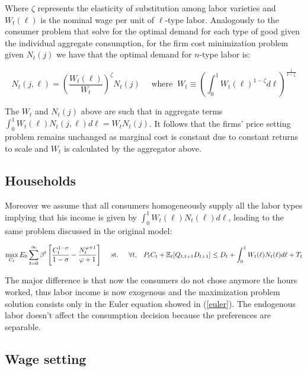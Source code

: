 \documentclass{article}
\newcommand{\Et}{\mathbb{E}_t}
\begin{document}
Where $\zeta$ represents the elasticity of substitution among labor varieties and $W_t(\ell)$ is the nominal wage per unit of $\ell$-type labor. Analogously to the consumer problem that solve for the optimal demand for each type of good given the individual aggregate consumption, for the firm cost minimization problem given $N_t(j)$ we have that the optimal demand for $n$-type labor is:

\begin{equation}
    N_t(j,\ell) = \left(\frac{W_t(\ell)}{W_t} \right)^\zeta N_t(j) \quad \textrm{ where } \ W_t \equiv \left(\int^1_0 W_t(\ell)^{1-\zeta} d\ell \right)^{\frac{1}{1-\zeta}}
\end{equation}

The $W_t$ and $N_t(j)$ above are such that in aggregate terms $\int^1_0 W_t(\ell) N_t(j,\ell) d\ell = W_t N_t(j)$. It follows that the firms' price setting problem remains unchanged as marginal cost is constant due to constant returns to scale and $W_t$ is calculated by the aggregator above.

\subsection{Households}
Moreover we assume that all consumers homogeneously supply all the labor types implying that his income is given by $\int^1_0 W_t(\ell) N_t(\ell) d\ell$, leading to the same problem discussed in the original model:

\begin{equation}
    \max_{C_t} E_0 \sum^\infty_{t=0} \beta^t \left[\frac{C_t^{1-\sigma}}{1-\sigma} - \frac{N_t^{\varphi+1}}{\varphi+1} \right] \hspace{1em}  \textrm{ st. } \hspace{1em} \forall t, \hspace{0.8em} P_t C_t + \Et[Q_{t,t+1} D_{t+1}] \leq D_t +  \int^1_0 W_t(\ell) N_t(\ell) d\ell + T_t
\end{equation}

The major difference is that now the consumers do not chose anymore the hours worked, thus labor income is now exogenous and the maximization problem solution consists only in the Euler equation showed in (\ref{euler}). The endogenous labor doesn't affect the consumption decision because the preferences are separable.

\subsection{Wage setting}
\end{document}
